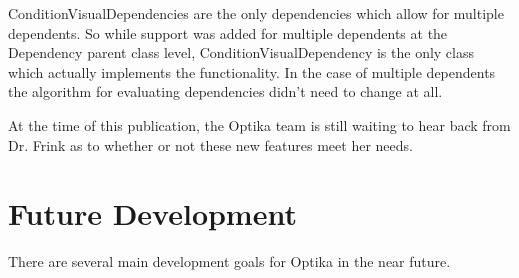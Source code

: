 ConditionVisualDependencies are the only dependencies which allow for multiple dependents. So while support was added for multiple dependents at the
Dependency parent class level, ConditionVisualDependency is the only class which actually implements the functionality. In the case of multiple dependents the algorithm
for evaluating dependencies didn't need to change at all.

At the time of this publication, the Optika team is still waiting to hear back from Dr. Frink as to whether or not these new features meet her needs.

\section{Future Development}
There are several main development goals for Optika in the near future. 
